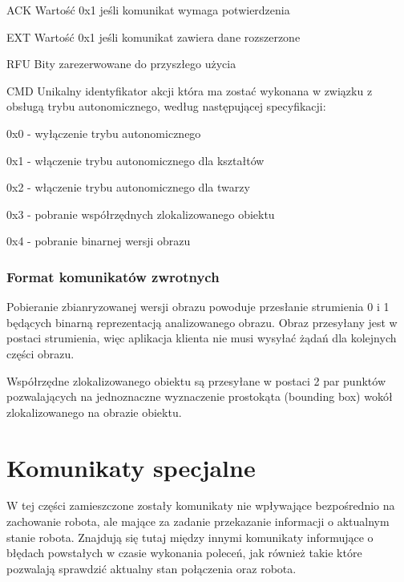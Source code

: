 \begin{basedescript}{\desclabelstyle{\pushlabel}\desclabelwidth{25mm}}
\setlength{\parsep}{0pt}
\setlength{\itemsep}{0mm}
\setlength{\parskip}{0pt}
\item[ACK]
	Wartość 0x1 jeśli komunikat wymaga potwierdzenia
\item[EXT] 
	Wartość 0x1 jeśli komunikat zawiera dane rozszerzone
\item[RFU] 
	Bity zarezerwowane do przyszłego użycia
\item[CMD] 
	Unikalny identyfikator akcji która ma zostać wykonana w związku z obsługą
	trybu autonomicznego, według następującej specyfikacji:
	\begin{desc}
	\item[0x0] - wyłączenie trybu autonomicznego
	\item[0x1] - włączenie trybu autonomicznego dla kształtów
	\item[0x2] - włączenie trybu autonomicznego dla twarzy
	\item[0x3] - pobranie współrzędnych zlokalizowanego obiektu
	\item[0x4] - pobranie binarnej wersji obrazu 
	\end{desc}
\end{basedescript}

\subsubsection{Format komunikatów zwrotnych}
Pobieranie zbianryzowanej wersji obrazu powoduje przesłanie strumienia 0 i 1
będących binarną reprezentacją analizowanego obrazu. Obraz przesyłany jest w
postaci strumienia, więc aplikacja klienta nie musi wysyłać żądań dla kolejnych
części obrazu.

Współrzędne zlokalizowanego obiektu są przesyłane w postaci 2 par punktów
pozwalających na jednoznaczne wyznaczenie prostokąta (bounding box) wokół
zlokalizowanego na obrazie obiektu.

\section{Komunikaty specjalne}
W tej części zamieszczone zostały komunikaty nie wpływające bezpośrednio na
zachowanie robota, ale mające za zadanie przekazanie informacji o aktualnym
stanie robota. Znajdują się tutaj między innymi komunikaty informujące o
błędach powstałych w czasie wykonania poleceń, jak również takie które pozwalają
sprawdzić aktualny stan połączenia oraz robota.

